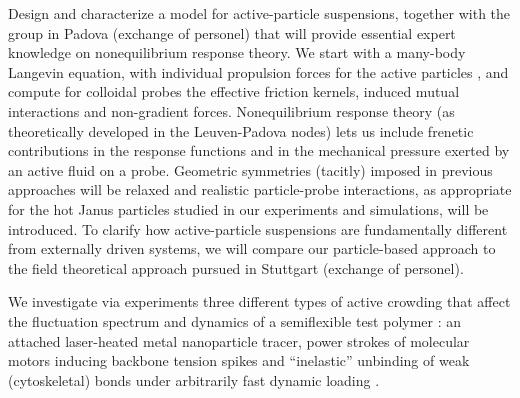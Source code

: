 \begin{workpackage}[id=WPactive,wphases=0-48,
  short=Active Particle Suspensions,%
  title=Probing active particle suspensions with colloids and polymers,
  lead=ULEI,
  ULEIRM=96,UNIPDRM=6,USTUTTRM=2]
\begin{tasklist}

\begin{task}[title=Nonequilibrium equations of state (NEOS),id=task1,PM=8,lead=ULEI,partners={UNIPD,USTUTT},
wphases=0-48!0.5]
Design and characterize a model for active-particle suspensions, together with the group
in Padova (exchange of personel) that will provide essential expert knowledge on
nonequilibrium response theory.
%
We start with a many-body Langevin equation, with individual propulsion forces for the
active particles \cite{solon-etal:2015}, and compute for colloidal probes the effective
friction kernels, induced mutual interactions and non-gradient forces.
%
Nonequilibrium response theory (as theoretically developed in the Leuven-Padova nodes) lets us include 
frenetic contributions in the response functions \cite{baiesi-wynants:2009} and in the mechanical pressure 
exerted by an active fluid on a probe. 
%
Geometric symmetries (tacitly) imposed in previous approaches will be relaxed and realistic particle-probe interactions, 
as appropriate for the hot Janus particles studied in our experiments and simulations, will be introduced.
%
To clarify how active-particle suspensions are fundamentally different from externally driven systems,
we will compare our particle-based approach to the field theoretical approach pursued in Stuttgart (exchange of personel). 

\end{task}

\begin{task}[title=Active Crowding,id=task2,lead=ULEI,partners={KUL},wphases=0-48!0.5]
We investigate via experiments three different types of active crowding that affect the fluctuation spectrum and dynamics of
a semiflexible test polymer \cite{otto-etal:2013}: an attached laser-heated metal nanoparticle tracer, power strokes of
molecular motors inducing backbone tension spikes and ``inelastic'' \cite{gralka-kroy:2015} unbinding of weak (cytoskeletal)
bonds under arbitrarily fast dynamic loading \cite{bullerjahn-sturm-kroy:2014}.
\end{task}


\end{tasklist}
\end{workpackage}
